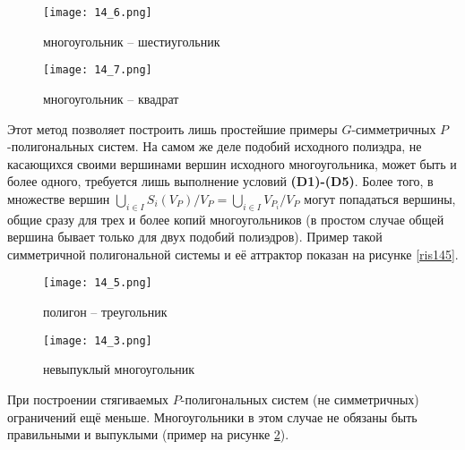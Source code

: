 \begin{figure}[h!]
\begin{center}
\begin{minipage}[h]{0.45\linewidth}
\texttt{[image: 14\_6.png]}
\caption{многоугольник -- шестиугольник} %
\label{ris146} %
\end{minipage}
\hfill
\begin{minipage}[h]{0.4\linewidth}
\texttt{[image: 14\_7.png]}
\caption{многоугольник -- квадрат}%
\label{ris147}%
\end{minipage}
\end{center}
\end{figure}

Этот метод позволяет построить лишь  простейшие примеры $G$-симмет\-рич\-ных $P$-полигональных систем. На самом же деле подобий исходного полиэдра, не касающихся своими вершинами вершин исходного многоугольника, может быть и более одного, требуется лишь выполнение условий {\bf (D1)-(D5)}. Более того, в множестве вершин  $\bigcup\limits_{i\in I}S_i(V_P)/V_P=\bigcup\limits_{i\in I}V_{P_i} / V_P$ могут попадаться вершины, общие сразу для трех и более копий многоугольников (в простом случае общей вершина бывает только для двух подобий полиэдров). Пример такой симметричной полигональной системы и её аттрактор показан на рисунке  \ref{ris145}. %


\begin{figure}[h!]
\begin{center}
\begin{minipage}[h]{0.45\linewidth}
\texttt{[image: 14\_5.png]}
\caption{полигон -- треугольник}%
\label{ris145}%
\end{minipage}
\hfill
\begin{minipage}[h]{0.4\linewidth}
\texttt{[image: 14\_3.png]}
\caption{невыпуклый многоугольник} %
\label{ris143} %
\end{minipage}
\end{center}
\end{figure}

При построении стягиваемых $P$-полигональных систем (не симметричных) ограничений ещё меньше. Многоугольники в этом случае не обязаны быть правильными и выпуклыми (пример на рисунке \ref{ris143}). 

